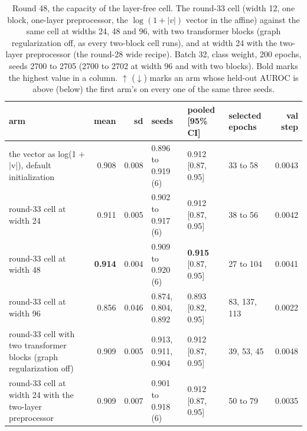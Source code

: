\begin{table}[H]
  \centering
  \scriptsize
  \setlength{\tabcolsep}{2.5pt}
  \caption[Round 48, the capacity of the layer-free cell]{Round 48, the capacity of the layer-free cell. The round-33 cell (width 12, one block, one-layer preprocessor, the $\log(1 + |v|)$ vector in the affine) against the same cell at widths 24, 48 and 96, with two transformer blocks (graph regularization off, as every two-block cell runs), and at width 24 with the two-layer preprocessor (the round-28 wide recipe). Batch 32, class weight, 200 epochs, seeds 2700 to 2705 (2700 to 2702 at width 96 and with two blocks). Bold marks the highest value in a column. $\uparrow$ ($\downarrow$) marks an arm whose held-out AUROC is above (below) the first arm's on every one of the same three seeds.}
  \label{tab:w64}
  \begin{tabular}{@{}lrrlllr@{}}
    \hline
    arm & mean & sd & seeds & pooled [95\% CI] & selected epochs & val step \\
    \hline
    the vector as log(1 $+$ |v|), default initialization & 0.908 & 0.008 & 0.896 to 0.919 (6) & 0.912 [0.87, 0.95] & 33 to 58 & 0.0043 \\
    round-33 cell at width 24 & 0.911 & 0.005 & 0.902 to 0.917 (6) & 0.912 [0.87, 0.95] & 38 to 56 & 0.0042 \\
    round-33 cell at width 48 & \textbf{0.914} & 0.004 & 0.909 to 0.920 (6) & \textbf{0.915} [0.87, 0.95] & 27 to 104 & 0.0041 \\
    round-33 cell at width 96 & 0.856 & 0.046 & 0.874, 0.804, 0.892 & 0.893 [0.82, 0.95] & 83, 137, 113 & 0.0022 \\
    round-33 cell with two transformer blocks (graph regularization off) & 0.909 & 0.005 & 0.913, 0.911, 0.904 & 0.912 [0.87, 0.95] & 39, 53, 45 & 0.0048 \\
    round-33 cell at width 24 with the two-layer preprocessor & 0.909 & 0.007 & 0.901 to 0.918 (6) & 0.912 [0.87, 0.95] & 50 to 79 & 0.0035 \\
    \hline
  \end{tabular}
\end{table}
